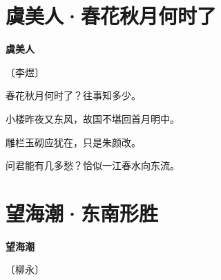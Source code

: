 \documentclass[12pt,UTF-8,openany,fontset=none]{ctexbook}
\begin{document}
\vspace{8pt}
\clearpage

\section{虞美人·春花秋月何时了}


\begin{center}
    {\bfseries 虞美人}

    \vspace{18pt}

    \begin{large}\xuwen
        〔李煜〕
    \end{large}

\end{center}

    \vspace{18pt}  %

\begin{center}
    \begin{Large}

        春花秋月何时了？往事知多少。\hspace{58pt}

        小楼昨夜又东风，故国不堪回首月明中。

        \vspace{18pt}  %

        雕栏玉砌应犹在，只是朱颜改。\hspace{58pt}

        问君能有几多愁？恰似一江春水向东流。

    \end{Large}

\end{center}

\vspace{8pt}
\clearpage

\section{望海潮·东南形胜}


\begin{center}
    {\bfseries 望海潮}

    \vspace{18pt}

    \begin{large}\xuwen
        〔柳永〕
    \end{large}

\end{center}
\end{document}
